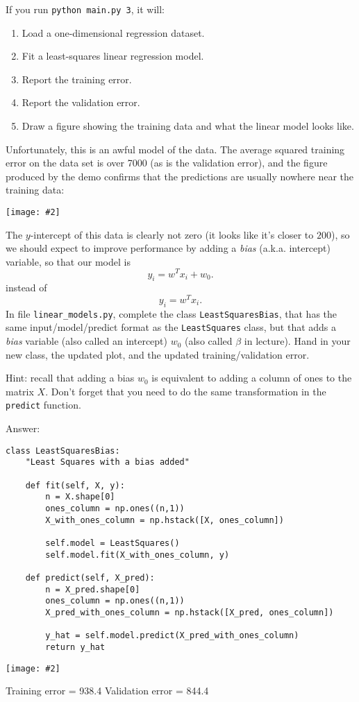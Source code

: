 \documentclass{article}
\newcommand{\blu}[1]{{\textcolor{blu}{#1}}}
\newcommand{\gre}[1]{\textcolor{gre}{#1}}
\newcommand\ans[1]{\par\gre{Answer: #1}}
\let\ask\blu
\newcommand{\centerfig}[2]{\begin{center}\texttt{[image: \#2]}\end{center}}
\begin{document}
\label{biasvar}
If you run \verb|python main.py 3|, it will:
\begin{enumerate}
\item Load a one-dimensional regression dataset.
\item Fit a least-squares linear regression model.
\item Report the training error.
\item Report the validation error.
\item Draw a figure showing the training data and what the linear model looks like.
\end{enumerate}
Unfortunately, this is an awful model of the data. The average squared training error on the data set is over 7000
(as is the validation error), and the figure produced by the demo confirms that the predictions are usually nowhere near
 the training data:
\centerfig{.5}{./figs/least_squares_no_bias.pdf}
The $y$-intercept of this data is clearly not zero (it looks like it's closer to $200$),
so we should expect to improve performance by adding a \emph{bias} (a.k.a. intercept) variable, so that our model is
\[
y_i = w^Tx_i + w_0.
\]
instead of
\[
y_i = w^Tx_i.
\]
\ask{In file \texttt{linear\string_models.py}, complete the class \texttt{LeastSquaresBias},
that has the same input/model/predict format as the \texttt{LeastSquares} class,
but that adds a \emph{bias} variable (also called an intercept) $w_0$ (also called $\beta$ in lecture). Hand in your new class, the updated plot,
and the updated training/validation error.}

Hint: recall that adding a bias $w_0$ is equivalent to adding a column of ones to the matrix $X$. Don't forget that you need to do the same transformation in the \texttt{predict} function.

\newpage
\ans{}
\begin{verbatim}
class LeastSquaresBias:
    "Least Squares with a bias added"

    def fit(self, X, y):
        n = X.shape[0]
        ones_column = np.ones((n,1))
        X_with_ones_column = np.hstack([X, ones_column])

        self.model = LeastSquares()
        self.model.fit(X_with_ones_column, y)

    def predict(self, X_pred):
        n = X_pred.shape[0]
        ones_column = np.ones((n,1))
        X_pred_with_ones_column = np.hstack([X_pred, ones_column])
        
        y_hat = self.model.predict(X_pred_with_ones_column)
        return y_hat
\end{verbatim}
\centerfig{.7}{figs/least_squares_yes_bias.pdf}
\gre{Training error = 938.4 \newline Validation error = 844.4}
\newpage
\end{document}
